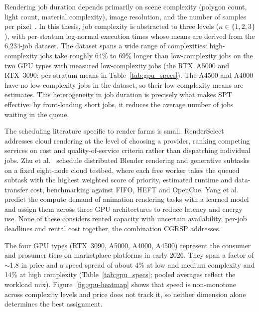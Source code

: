 Rendering job duration depends primarily on scene complexity (polygon count, light count, material complexity), image resolution, and the number of samples per pixel~\cite{pharr2023physically}. In this thesis, job complexity is abstracted to three levels ($\kappa \in \{1, 2, 3\}$), with per-stratum log-normal execution times whose means are derived from the 6,234-job dataset. The dataset spans a wide range of complexities: high-complexity jobs take roughly 64\% to 69\% longer than low-complexity jobs on the two GPU types with measured low-complexity jobs (the RTX~A5000 and RTX~3090; per-stratum means in Table~\ref{tab:gpu_specs}). The A4500 and A4000 have no low-complexity jobs in the dataset, so their low-complexity means are estimates. This heterogeneity in job duration is precisely what makes SPT effective: by front-loading short jobs, it reduces the average number of jobs waiting in the queue.

The scheduling literature specific to render farms is small. RenderSelect~\cite{ruby2016renderselect} addresses cloud rendering at the level of choosing a provider, ranking competing services on cost and quality-of-service criteria rather than dispatching individual jobs. Zhu et al.~\cite{zhu2026collaborative} schedule distributed Blender rendering and generative subtasks on a fixed eight-node cloud testbed, where each free worker takes the queued subtask with the highest weighted score of priority, estimated runtime and data-transfer cost, benchmarking against FIFO, HEFT and OpenCue. Yang et al.~\cite{yang2026adaptive} predict the compute demand of animation rendering tasks with a learned model and assign them across three GPU architectures to reduce latency and energy use. None of these considers rented capacity with uncertain availability, per-job deadlines and rental cost together, the combination CGRSP addresses.

The four GPU types (RTX~3090, A5000, A4000, A4500) represent the consumer and prosumer tiers on marketplace platforms in early 2026. They span a factor of $\sim$1.8 in price and a speed spread of about 4\% at low and medium complexity and 14\% at high complexity (Table~\ref{tab:gpu_specs}; pooled averages reflect the workload mix). Figure~\ref{fig:gpu-heatmap} shows that speed is non-monotone across complexity levels and price does not track it, so neither dimension alone determines the best assignment.

